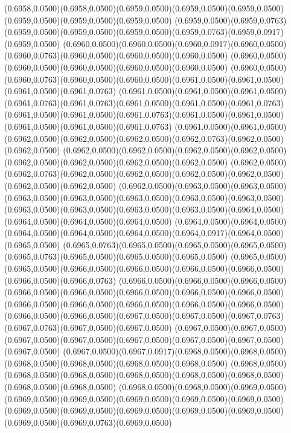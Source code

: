 (0.6958,0.0500)(0.6958,0.0500)(0.6959,0.0500)(0.6959,0.0500)(0.6959,0.0500)(0.6959,0.0500)(0.6959,0.0500)(0.6959,0.0500)
(0.6959,0.0500)(0.6959,0.0763)(0.6959,0.0500)(0.6959,0.0500)(0.6959,0.0500)(0.6959,0.0763)(0.6959,0.0917)(0.6959,0.0500)
(0.6960,0.0500)(0.6960,0.0500)(0.6960,0.0917)(0.6960,0.0500)(0.6960,0.0763)(0.6960,0.0500)(0.6960,0.0500)(0.6960,0.0500)
(0.6960,0.0500)(0.6960,0.0500)(0.6960,0.0500)(0.6960,0.0500)(0.6960,0.0500)
\PST@Solid(0.6960,0.0500)(0.6960,0.0763)(0.6960,0.0500)(0.6960,0.0500)(0.6961,0.0500)(0.6961,0.0500)(0.6961,0.0500)(0.6961,0.0763)
(0.6961,0.0500)(0.6961,0.0500)(0.6961,0.0500)(0.6961,0.0763)(0.6961,0.0763)(0.6961,0.0500)(0.6961,0.0500)(0.6961,0.0763)
(0.6961,0.0500)(0.6961,0.0500)(0.6961,0.0763)(0.6961,0.0500)(0.6961,0.0500)(0.6961,0.0500)(0.6961,0.0500)(0.6961,0.0763)
(0.6961,0.0500)(0.6961,0.0500)(0.6962,0.0500)(0.6962,0.0500)(0.6962,0.0500)(0.6962,0.0763)(0.6962,0.0500)(0.6962,0.0500)
(0.6962,0.0500)(0.6962,0.0500)(0.6962,0.0500)(0.6962,0.0500)(0.6962,0.0500)(0.6962,0.0500)(0.6962,0.0500)(0.6962,0.0500)
(0.6962,0.0500)(0.6962,0.0763)(0.6962,0.0500)(0.6962,0.0500)(0.6962,0.0500)(0.6962,0.0500)(0.6962,0.0500)(0.6962,0.0500)
(0.6962,0.0500)(0.6963,0.0500)(0.6963,0.0500)(0.6963,0.0500)(0.6963,0.0500)(0.6963,0.0500)(0.6963,0.0500)(0.6963,0.0500)
(0.6963,0.0500)(0.6963,0.0500)(0.6963,0.0500)(0.6963,0.0500)(0.6964,0.0500)(0.6964,0.0500)(0.6964,0.0500)(0.6964,0.0500)
(0.6964,0.0500)(0.6964,0.0500)(0.6964,0.0500)(0.6964,0.0500)(0.6964,0.0500)(0.6964,0.0917)(0.6964,0.0500)(0.6965,0.0500)
(0.6965,0.0763)(0.6965,0.0500)(0.6965,0.0500)(0.6965,0.0500)(0.6965,0.0763)(0.6965,0.0500)(0.6965,0.0500)(0.6965,0.0500)
(0.6965,0.0500)(0.6965,0.0500)(0.6966,0.0500)(0.6966,0.0500)(0.6966,0.0500)(0.6966,0.0500)(0.6966,0.0500)(0.6966,0.0763)
(0.6966,0.0500)(0.6966,0.0500)(0.6966,0.0500)(0.6966,0.0500)(0.6966,0.0500)(0.6966,0.0500)(0.6966,0.0500)(0.6966,0.0500)
(0.6966,0.0500)(0.6966,0.0500)(0.6966,0.0500)(0.6966,0.0500)(0.6966,0.0500)
\PST@Solid(0.6966,0.0500)(0.6966,0.0500)(0.6967,0.0500)(0.6967,0.0500)(0.6967,0.0763)(0.6967,0.0763)(0.6967,0.0500)(0.6967,0.0500)
(0.6967,0.0500)(0.6967,0.0500)(0.6967,0.0500)(0.6967,0.0500)(0.6967,0.0500)(0.6967,0.0500)(0.6967,0.0500)(0.6967,0.0500)
(0.6967,0.0500)(0.6967,0.0917)(0.6968,0.0500)(0.6968,0.0500)(0.6968,0.0500)(0.6968,0.0500)(0.6968,0.0500)(0.6968,0.0500)
(0.6968,0.0500)(0.6968,0.0500)(0.6968,0.0500)(0.6968,0.0500)(0.6968,0.0500)(0.6968,0.0500)(0.6968,0.0500)(0.6968,0.0500)
(0.6968,0.0500)(0.6968,0.0500)(0.6969,0.0500)(0.6969,0.0500)(0.6969,0.0500)(0.6969,0.0500)(0.6969,0.0500)(0.6969,0.0500)
(0.6969,0.0500)(0.6969,0.0500)(0.6969,0.0500)(0.6969,0.0500)(0.6969,0.0500)(0.6969,0.0500)(0.6969,0.0763)(0.6969,0.0500)
